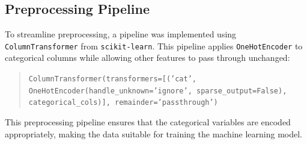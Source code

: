 \documentclass[a4paper,12pt]{article}
\begin{document}
\begin{justify}
\subsection{Preprocessing Pipeline}
To streamline preprocessing, a pipeline was implemented using \texttt{ColumnTransformer} from \texttt{scikit-learn}. This pipeline applies \texttt{OneHotEncoder} to categorical columns while allowing other features to pass through unchanged:
\begin{quote}
\texttt{ColumnTransformer(transformers=[('cat', OneHotEncoder(handle\_unknown='ignore', sparse\_output=False), categorical\_cols)], remainder='passthrough')}
\end{quote}
This preprocessing pipeline ensures that the categorical variables are encoded appropriately, making the data suitable for training the machine learning model.

\end{justify}
\end{document}
